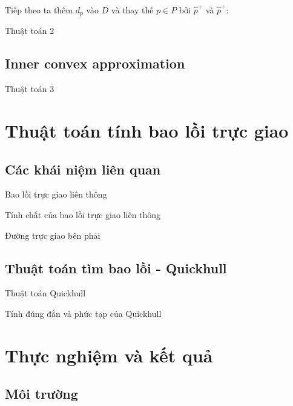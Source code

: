 \documentclass[11pt]{beamer}
\theoremstyle{definition}
\theoremstyle{plain}
\theoremstyle{plain}
\theoremstyle{remark}
\begin{document}
\begin{frame}
	Tiếp theo ta thêm $d_p$ vào $D$ và thay thế $p \in P$ bởi $\hat p^+$ và $\hat p^+$:
	
\end{frame}

\begin{frame}{Thuật toán 2}
	
\end{frame}
\subsection{Inner convex approximation}
\begin{frame}{Thuật toán 3}
	
\end{frame}

\section{Thuật toán tính bao lồi trực giao}
\subsection{Các khái niệm liên quan}
\begin{frame}{Bao lồi trực giao liên thông}
	
\end{frame}
\begin{frame}{Tính chất của bao lồi trực giao liên thông}
	
\end{frame}
\begin{frame}{Đường trực giao bên phải}
	
\end{frame}

\subsection{Thuật toán tìm bao lồi - Quickhull}
\begin{frame}{ Thuật toán Quickhull}
	
\end{frame}
\begin{frame}{Tính đúng đắn và phức tạp của Quickhull}

\end{frame}
\section{Thực nghiệm và kết quả}
\subsection{Môi trường}
\end{document}
